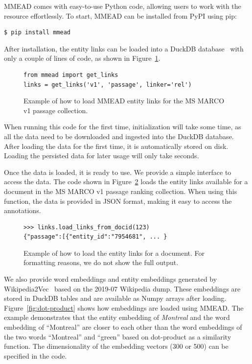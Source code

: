 MMEAD comes with easy-to-use Python code, allowing users to work with the resource effortlessly. To start, MMEAD can be installed from PyPI using pip:

\begin{verbatim}
$ pip install mmead
\end{verbatim}

After installation, the entity links can be loaded into a DuckDB database~\citep{duckdb} with only a couple of lines of code, as shown in Figure~\ref{fig:load-links}.
%
\begin{figure}
\begin{verbatim}
from mmead import get_links
links = get_links('v1', 'passage', linker='rel')
\end{verbatim}
\caption{Example of how to load MMEAD entity links for the MS MARCO v1 passage collection.}
\label{fig:load-links}
\end{figure}
%
When running this code for the first time, initialization will take some time, as all the data need to be downloaded and ingested into the DuckDB database. After loading the data for the first time, it is automatically stored on disk. Loading the persisted data for later usage will only take seconds.

Once the data is loaded, it is ready to use. We provide a simple interface to access the data. The code shown in Figure~\ref{fig:load-links-for-document} loads the entity links available for a document in the MS MARCO v1 passage ranking collection. When using this function, the data is provided in JSON format, making it easy to access the annotations.

\begin{figure}
\begin{verbatim}
>>> links.load_links_from_docid(123)
{"passage":[{"entity_id":"7954681", ... }
\end{verbatim}
	\caption{Example of how to load the entity links for a document. For formatting reasons, we do not show the full output. }
	\label{fig:load-links-for-document}
\end{figure}

We also provide word embeddings and entity embeddings generated by Wikipedia2Vec~\citep{wikipedia2vec} based on the 2019-07 Wikipedia dump. These embeddings are stored in DuckDB tables and are available as Numpy arrays after loading. Figure~\ref{fig:dot-product} shows how embeddings are loaded using MMEAD. The example demonstrates that the entity embedding of \emph{Montreal} and the word embedding of ``Montreal'' are closer to each other than the word embeddings of the two words ``Montreal'' and ``green'' based on dot-product as a similarity function. The dimensionality of the embedding vectors (300 or 500) can be specified in the code.

